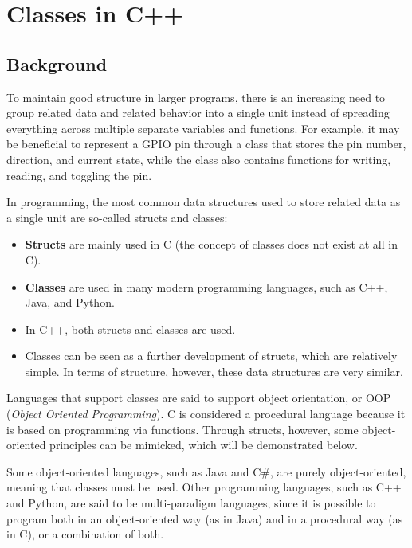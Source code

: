 
\section{Classes in C++}
\label{c2:sec:classes1}\label{c2:app:a}

\subsection{Background}
\label{c2:sec:background}
To maintain good structure in larger programs, there is an increasing need to group related data
and related behavior into a single unit instead of spreading everything across multiple separate
variables and functions. For example, it may be beneficial to represent a GPIO pin through a class
that stores the pin number, direction, and current state, while the class also contains functions
for writing, reading, and toggling the pin.

In programming, the most common data structures used to store related data as a single unit are
so-called structs and classes:
\begin{itemize}
  \item \textbf{Structs} are mainly used in C (the concept of classes does not exist at all in C).
  \item \textbf{Classes} are used in many modern programming languages, such as C++, Java, and
    Python.
  \item In C++, both structs and classes are used.
  \item Classes can be seen as a further development of structs, which are relatively simple. In
    terms of structure, however, these data structures are very similar.
\end{itemize}
Languages that support classes are said to support object orientation, or OOP (\emph{Object
Oriented Programming}). C is considered a procedural language because it is based on programming
via functions. Through structs, however, some object-oriented principles can be mimicked, which
will be demonstrated below.

Some object-oriented languages, such as Java and C\#, are purely object-oriented, meaning that
classes must be used. Other programming languages, such as C++ and Python, are said to be
multi-paradigm languages, since it is possible to program both in an object-oriented way (as in
Java) and in a procedural way (as in C), or a combination of both.

